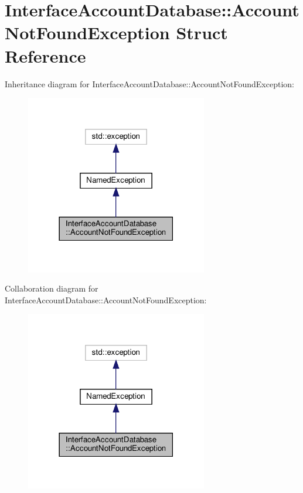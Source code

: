 \hypertarget{structInterfaceAccountDatabase_1_1AccountNotFoundException}{}\section{Interface\+Account\+Database\+:\+:Account\+Not\+Found\+Exception Struct Reference}
\label{structInterfaceAccountDatabase_1_1AccountNotFoundException}


Inheritance diagram for Interface\+Account\+Database\+:\+:Account\+Not\+Found\+Exception\+:\nopagebreak
\begin{figure}[H]
\begin{center}
\leavevmode
\includegraphics[width=225pt]{da/def/structInterfaceAccountDatabase_1_1AccountNotFoundException__inherit__graph}
\end{center}
\end{figure}


Collaboration diagram for Interface\+Account\+Database\+:\+:Account\+Not\+Found\+Exception\+:\nopagebreak
\begin{figure}[H]
\begin{center}
\leavevmode
\includegraphics[width=225pt]{d1/daa/structInterfaceAccountDatabase_1_1AccountNotFoundException__coll__graph}
\end{center}
\end{figure}
